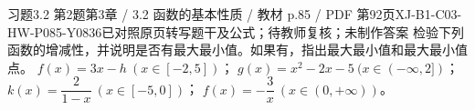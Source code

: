 \par\noindent\begin{minipage}{\linewidth}
\begin{bankitem}{习题3.2 第2题}{第3章 / 3.2 函数的基本性质 / 教材 p.85 / PDF 第92页}{XJ-B1-C03-HW-P085-Y0836}{已对照原页转写题干及公式；待教师复核；未制作答案}
检验下列函数的增减性，并说明是否有最大最小值。如果有，指出最大最小值和最大最小值点。
$f(x)=3x-h\ (x\in[-2,5])$；
$g(x)=x^2-2x-5\ (x\in(-\infty,2])$；
$k(x)=\dfrac2{1-x}\ (x\in[-5,0])$；
$f(x)=-\dfrac3x\ (x\in(0,+\infty))$。
\end{bankitem}
\end{minipage}\par\medskip
